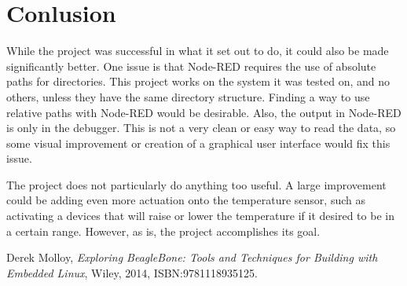 \documentclass[12pt]{article}
\begin{document}
\newpage

\section{Conlusion} \label{cncl}
While the project was successful in what it set out to do, it could also be made significantly better.  One issue is that Node-RED requires the use of absolute paths for directories.  This project works on the system it was tested on, and no others, unless they have the same directory structure.  Finding a way to use relative paths with Node-RED would be desirable.  Also, the output in Node-RED is only in the debugger.  This is not a very clean or easy way to read the data, so some visual improvement or creation of a graphical user interface would fix this issue.\par
The project does not particularly do anything too useful.  A large improvement could be adding even more actuation onto the temperature sensor, such as activating a devices that will raise or lower the temperature if it desired to be in a certain range.  However, as is, the project accomplishes its goal.

\newpage

\begin{thebibliography}{1}

 Derek Molloy, {\em Exploring BeagleBone: Tools and Techniques for Building with Embedded Linux}, Wiley, 2014, ISBN:9781118935125.

\end{thebibliography}
\end{document}
